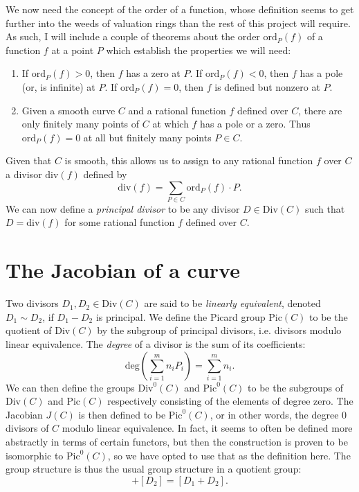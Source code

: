 \documentclass[12pt]{article}
\theoremstyle{definition}
\begin{document}
We now need the concept of the order of a function, whose definition seems to get further into the weeds of valuation rings than the rest of this project will require.
As such, I will include a couple of theorems about the order $\mathrm{ord}_P(f)$ of a function $f$ at a point $P$ which establish the properties we will need:
\begin{enumerate}
	\item If $\mathrm{ord}_P(f) > 0$, then $f$ has a zero at $P$.
	      If $\mathrm{ord}_P(f) < 0$, then $f$ has a pole (or, is infinite) at $P$.
	      If $\mathrm{ord}_P(f) = 0$, then $f$ is defined but nonzero at $P$.
	\item Given a smooth curve $C$ and a rational function $f$ defined over $C$, there are only finitely many points of $C$ at which $f$ has a pole or a zero.
	      Thus $\mathrm{ord}_P(f) = 0$ at all but finitely many points $P \in C$.
\end{enumerate}
Given that $C$ is smooth, this allows us to assign to any rational function $f$ over $C$ a divisor $\mathrm{div}(f)$ defined by \begin{equation*}
	\mathrm{div}(f) = \sum_{P \in C} \mathrm{ord}_P(f)\cdot P.
\end{equation*}
We can now define a \textit{principal divisor} to be any divisor $D \in \mathrm{Div}(C)$ such that $D = \mathrm{div}(f)$ for some rational function $f$ defined over $C$.

\section{The Jacobian of a curve}
Two divisors $D_1, D_2 \in \mathrm{Div}(C)$ are said to be \textit{linearly equivalent}, denoted $D_1 \sim D_2$, if $D_1 - D_2$ is principal.
We define the Picard group $\mathrm{Pic}(C)$ to be the quotient of $\mathrm{Div}(C)$ by the subgroup of principal divisors, i.e. divisors modulo linear equivalence.
The \textit{degree} of a divisor is the sum of its coefficients: \begin{equation}
	\mathrm{deg}\left( \sum_{i=1}^m n_iP_i \right) = \sum_{i=1}^m n_i.
\end{equation}
We can then define the groups $\mathrm{Div}^0(C)$ and $\mathrm{Pic}^0(C)$ to be the subgroups of $\mathrm{Div}(C)$ and $\mathrm{Pic}(C)$ respectively consisting of the elements of degree zero.
The Jacobian $J(C)$ is then defined to be $\mathrm{Pic}^0(C)$, or in other words, the degree 0 divisors of $C$ modulo linear equivalence.
In fact, it seems to often be defined more abstractly in terms of certain functors, but then the construction is proven to be isomorphic to $\mathrm{Pic}^0(C)$, so we have opted to use that as the definition here.
The group structure is thus the usual group structure in a quotient group: \begin{equation*}
  [D_1] + [D_2] = [D_1 + D_2].
\end{equation*}
\end{document}
